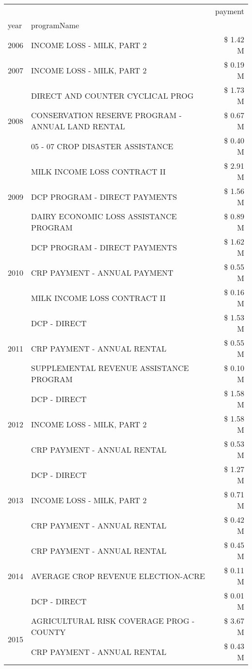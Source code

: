 \begin{tabular}{llr}
\toprule
 &  & payment \\
year & programName &  \\
\midrule
2006 & INCOME LOSS - MILK, PART 2 & \$ 1.42 M \\
\cline{1-3}
2007 & INCOME LOSS - MILK, PART 2 & \$ 0.19 M \\
\cline{1-3}
\multirow[t]{3}{*}{2008} & DIRECT AND COUNTER CYCLICAL PROG & \$ 1.73 M \\
 & CONSERVATION RESERVE PROGRAM - ANNUAL LAND RENTAL & \$ 0.67 M \\
 & 05 - 07 CROP DISASTER ASSISTANCE & \$ 0.40 M \\
\cline{1-3}
\multirow[t]{3}{*}{2009} & MILK INCOME LOSS CONTRACT II & \$ 2.91 M \\
 & DCP PROGRAM - DIRECT PAYMENTS & \$ 1.56 M \\
 & DAIRY ECONOMIC LOSS ASSISTANCE PROGRAM & \$ 0.89 M \\
\cline{1-3}
\multirow[t]{3}{*}{2010} & DCP PROGRAM - DIRECT PAYMENTS & \$ 1.62 M \\
 & CRP PAYMENT - ANNUAL PAYMENT & \$ 0.55 M \\
 & MILK INCOME LOSS CONTRACT II & \$ 0.16 M \\
\cline{1-3}
\multirow[t]{3}{*}{2011} & DCP - DIRECT & \$ 1.53 M \\
 & CRP PAYMENT - ANNUAL RENTAL & \$ 0.55 M \\
 & SUPPLEMENTAL REVENUE ASSISTANCE PROGRAM & \$ 0.10 M \\
\cline{1-3}
\multirow[t]{3}{*}{2012} & DCP - DIRECT & \$ 1.58 M \\
 & INCOME LOSS - MILK, PART 2 & \$ 1.58 M \\
 & CRP PAYMENT - ANNUAL RENTAL & \$ 0.53 M \\
\cline{1-3}
\multirow[t]{3}{*}{2013} & DCP - DIRECT & \$ 1.27 M \\
 & INCOME LOSS - MILK, PART 2 & \$ 0.71 M \\
 & CRP PAYMENT - ANNUAL RENTAL & \$ 0.42 M \\
\cline{1-3}
\multirow[t]{3}{*}{2014} & CRP PAYMENT - ANNUAL RENTAL & \$ 0.45 M \\
 & AVERAGE CROP REVENUE ELECTION-ACRE & \$ 0.11 M \\
 & DCP - DIRECT & \$ 0.01 M \\
\cline{1-3}
\multirow[t]{3}{*}{2015} & AGRICULTURAL RISK COVERAGE PROG - COUNTY & \$ 3.67 M \\
 & CRP PAYMENT - ANNUAL RENTAL & \$ 0.43 M \\

\end{tabular}
